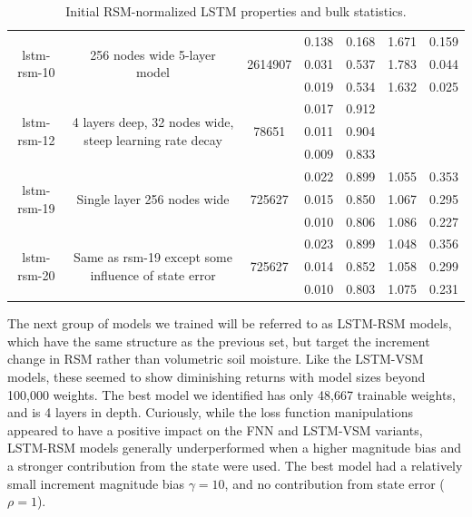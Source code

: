 \begin{table}[h!p]
\begin{sideways}
\begin{tabular}{c|c|c|c|c|c|c }
\hline
\multirow{3}{6em}{lstm-rsm-10} & \multirow{3}{16em}{256 nodes wide 5-layer model} & \multirow{3}{4em}{2614907} & 0.138 & 0.168 & 1.671 & 0.159 \\ & & & 0.031 & 0.537 & 1.783 & 0.044 \\ & & & 0.019 & 0.534 & 1.632 & 0.025 \\
\hline
\multirow{3}{6em}{lstm-rsm-12} & \multirow{3}{16em}{4 layers deep, 32 nodes wide, steep learning rate decay} & \multirow{3}{4em}{78651} & 0.017 & 0.912 &  &  \\ & & & 0.011 & 0.904 &  &  \\ & & & 0.009 & 0.833 &  &  \\
\hline
\multirow{3}{6em}{lstm-rsm-19} & \multirow{3}{16em}{Single layer 256 nodes wide} & \multirow{3}{4em}{725627} & 0.022 & 0.899 & 1.055 & 0.353 \\ & & & 0.015 & 0.850 & 1.067 & 0.295 \\ & & & 0.010 & 0.806 & 1.086 & 0.227 \\
\hline
\multirow{3}{6em}{lstm-rsm-20} & \multirow{3}{16em}{Same as rsm-19 except some influence of state error} & \multirow{3}{4em}{725627} & 0.023 & 0.899 & 1.048 & 0.356 \\ & & & 0.014 & 0.852 & 1.058 & 0.299 \\ & & & 0.010 & 0.803 & 1.075 & 0.231 \\
    \end{tabular}
\end{sideways}
    \caption{Initial RSM-normalized LSTM properties and bulk statistics.}
    \label{model-init-lstm-rsm-table}
\end{table}

The next group of models we trained will be referred to as LSTM-RSM models, which have the same structure as the previous set, but target the increment change in RSM rather than volumetric soil moisture. Like the LSTM-VSM models, these seemed to show diminishing returns with model sizes beyond 100,000 weights. The best model we identified has only 48,667 trainable weights, and is 4 layers in depth. Curiously, while the loss function manipulations appeared to have a positive impact on the FNN and LSTM-VSM variants, LSTM-RSM models generally underperformed when a higher magnitude bias and a stronger contribution from the state were used. The best model had a relatively small increment magnitude bias $\gamma=10$, and no contribution from state error ($\rho=1$).



